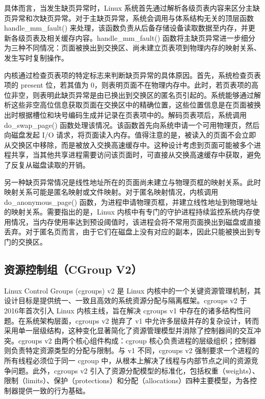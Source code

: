 具体而言，当发生缺页异常时，Linux 系统首先通过解析各级页表内容来区分主缺页异常和次缺页异常。对于主缺页异常，系统会调用与体系结构无关的顶层函数 handle\_mm\_fault() 来处理，该函数负责从后备存储设备读取数据至内存，并更新各级页表及相关缓存内容。handle\_mm\_fault() 函数将主缺页异常进一步细分为三种不同情况：页面被换出到交换区、尚未建立页表项到物理内存的映射关系、发生写时复制操作。

内核通过检查页表项的特定标志来判断缺页异常的具体原因。首先，系统检查页表项的 present 位，若其值为 0，则表明页面不在物理内存中。此时，若页表项的高位非空，则表明此缺页异常是由已换出到交换区的匿名页引起的。系统能够通过解析这些非空高位信息获取页面在交换区中的精确位置，这些位置信息是在页面被换出时根据槽位和块号编码生成并记录在页表项中的。解码页表项后，系统调用 do\_swap\_page() 函数处理该情况。该函数首先向系统申请一个可用物理页，然后向磁盘发起 I/O 请求，将页面读入内存。值得注意的是，被读入的页面不会立即从交换区中移除，而是被放入交换高速缓存中。这种设计考虑到页面可能被多个进程共享，当其他共享进程需要访问该页面时，可直接从交换高速缓存中获取，避免了反复从磁盘读取的开销。

另一种缺页异常情况是线性地址所在的页面尚未建立与物理页框的映射关系。此时映射关系可能是匿名映射或文件映射。对于匿名映射情况，内核调用 do\_anonymous\_page() 函数，为进程申请物理页框，并建立线性地址到物理地址的映射关系。需要指出的是，Linux 内核中有专门的守护进程持续监控系统内存使用情况，当内存使用率达到预设阈值时，该进程会将不常用页面换出到磁盘或直接丢弃。对于匿名页而言，由于它们在磁盘上没有对应的副本，因此只能被换出到专门的交换区。


\subsection{资源控制组（CGroup V2）}

Linux Control Groups (cgroups) v2 是 Linux 内核中的一个关键资源管理机制，其设计目标是提供统一、一致且高效的系统资源分配与隔离框架。cgroups v2 于2016年首次引入 Linux 内核主线，旨在解决 cgroups v1 中存在的诸多结构性问题。在系统架构层面，cgroups v2 抛弃了 v1 中允许多层级并存的复杂设计，转而采用单一层级结构，这种变化显著简化了资源管理模型并消除了控制器间的交互冲突。cgroups v2 由两个核心组件构成：cgroup 核心负责进程的层级组织；控制器则负责特定资源类型的分配与限制。与 v1 不同，cgroups v2 强制要求一个进程的所有线程必须位于同一 cgroup 中，从根本上解决了线程与内部节点之间的资源竞争问题。此外，cgroups v2 引入了资源分配模型的标准化，包括权重（weights）、限制（limits）、保护（protections）和分配（allocations）四种主要模型，为各控制器提供一致的行为基础。


